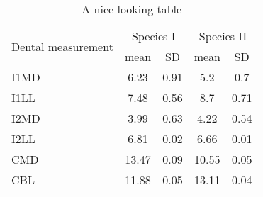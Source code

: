 \begin{table}
  \caption{A nice looking table}
  \centering
  \label{table:nice_table}
  \begin{tabular}{l c c c c}
    \hline
    \multirow{2}{*}{Dental measurement} & \multicolumn{2}{c}{Species I} & \multicolumn{2}{c}{Species II}                \\
    \cline{2-5}
                                        & mean                          & SD                             & mean  & SD   \\
    \hline
    I1MD                                & 6.23                          & 0.91                           & 5.2   & 0.7  \\

    I1LL                                & 7.48                          & 0.56                           & 8.7   & 0.71 \\

    I2MD                                & 3.99                          & 0.63                           & 4.22  & 0.54 \\

    I2LL                                & 6.81                          & 0.02                           & 6.66  & 0.01 \\

    CMD                                 & 13.47                         & 0.09                           & 10.55 & 0.05 \\

    CBL                                 & 11.88                         & 0.05                           & 13.11 & 0.04 \\
    \hline
  \end{tabular}
\end{table}


